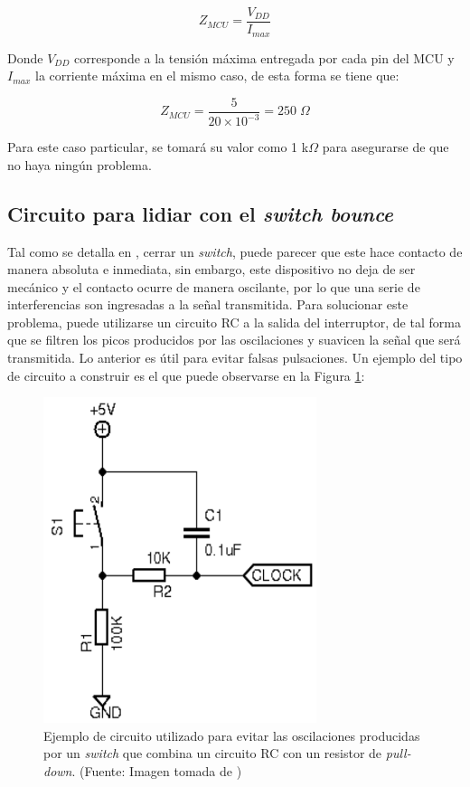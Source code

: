 \begin{equation}
    Z_{MCU} = \frac{V_{DD}}{I_{max}}
\end{equation}

Donde $V_{DD}$ corresponde a la tensión máxima entregada por cada pin del MCU y $I_{max}$ la corriente máxima en el mismo caso, de esta forma se tiene que: 

\begin{equation}
    Z_{MCU} = \frac{5}{20 \times 10^{-3}} = 250 \; \Omega
\end{equation}

Para este caso particular, se tomará su valor como 1 k$\Omega$ para asegurarse de que no haya ningún problema.

\subsection{Circuito para lidiar con el \textit{switch bounce}} \label{sec:cir1}
Tal como se detalla en \cite{RC}, cerrar un \textit{switch}, puede parecer que este hace contacto de manera absoluta e inmediata, sin embargo, este dispositivo no deja de ser mecánico y el contacto ocurre de manera oscilante, por lo que una serie de interferencias son ingresadas a la señal transmitida. Para solucionar este problema, puede utilizarse un circuito RC a la salida del interruptor, de tal forma que se filtren los picos producidos por las oscilaciones y suavicen la señal que será transmitida. Lo anterior es útil para evitar falsas pulsaciones. Un ejemplo del tipo de circuito a construir es el que puede observarse en la Figura \ref{fig:RC1}: 

\begin{figure}[H]
\centering
\includegraphics[width=80mm]{./Figuras/Nota_teorica/RC1}
\caption{Ejemplo de circuito utilizado para evitar las oscilaciones producidas por un \textit{switch} que combina un circuito RC con un resistor de \textit{pull-down}. (Fuente: Imagen tomada de \cite{RC})}
\label{fig:RC1}
\end{figure}

